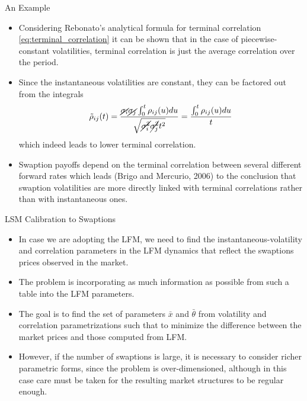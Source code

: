 \documentclass{beamer}
\begin{document}
\begin{frame}{An Example}
\begin{itemize}
	\item<1-> Considering Rebonato's analytical formula for terminal correlation \cref{eq:terminal_correlation} it can be shown that in the case of piecewise-constant volatilities, terminal correlation is just the average correlation over the period. 
  	\item<2-> Since the instantaneous volatilities are constant, they can be factored out from the integrals
	  \begin{equation*}	    \tilde{\rho}_{ij}(t)=\frac{\cancel{\sigma_i}\cancel{\sigma_j}\int_0^t\rho_{ij}(u)du}{\sqrt{\cancel{\sigma_i^2}\cancel{\sigma_j^2} t^2}}= \frac{\int_0^t\rho_{ij}(u)du}{t}		
  	\end{equation*}
  	which indeed leads to lower terminal correlation.
  	\item<3-> Swaption payoffs depend on the terminal correlation between several different forward rates which leads (Brigo and Mercurio, 2006) to the conclusion that swaption volatilities are more directly linked with terminal correlations rather than with instantaneous ones.
  \end{itemize}
\end{frame}

\begin{frame}{LSM Calibration to Swaptions}
\begin{itemize}
\item In case we are adopting the LFM, we need to find the instantaneous-volatility and correlation parameters in the LFM dynamics that reflect the swaptions prices observed in the market.

\item The problem is incorporating as much information as possible from such a table into the LFM parameters. 
\item The goal is to find the set of parameters $\bar{x}$ and $\bar{\theta}$ from volatility and correlation parametrizations such that to minimize the difference between the market prices and those computed from LFM.
\item However, if the number of swaptions is large, it is necessary to consider richer parametric forms, since the problem is over-dimensioned, although in this case care must be taken for the resulting market structures to be regular enough.
\end{itemize}
\end{frame}
\end{document}
